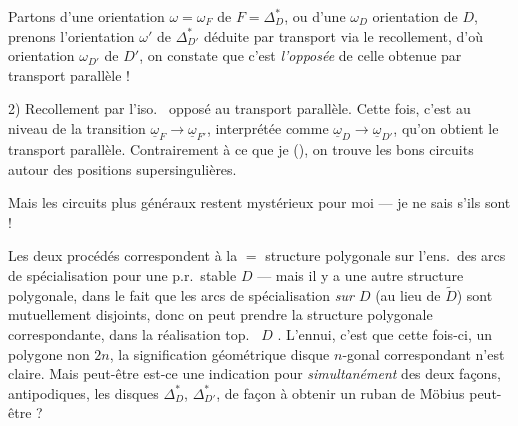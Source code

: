\documentclass[11pt,a4paper]{article}
\begin{document}

Partons d'une orientation $\omega = \omega_F$ de $F = \Delta^{\ast}_D$, ou d'une $\omega_D$ orientation de $D$, prenons l'orientation $\omega'$ de $\Delta^{\ast}_{D'}$ déduite par transport via le recollement, d'où orientation $\omega_{D'}$ de $D'$, on constate  que c'est \emph{l'opposée} de celle obtenue par transport parallèle !

2) Recollement par l'iso.\  opposé au transport parallèle. Cette fois, c'est au niveau de la transition $\underline{\omega}_F \to \underline{\omega}_{F'}$, interprétée comme $\underline{\omega}_D \to \underline{\omega}_{D'}$, qu'on obtient le transport parallèle. Contrairement à ce que je  (), on trouve les bons circuits autour des positions supersingulières.

Mais les circuits plus généraux restent mystérieux pour moi --- je ne sais s'ils sont  !

Les deux procédés correspondent à la $=$ structure polygonale sur l'ens.\ des arcs de spécialisation  pour une p.r.\ stable $D$ --- mais il y a une autre structure polygonale, dans le fait que  les arcs de spécialisation \emph{sur $D$} (au lieu de $\widetilde{D}$) sont mutuellement disjoints, donc on peut prendre la structure polygonale correspondante, dans la réalisation top.\ \ill{} \ill{} $D$ . L'ennui, c'est que cette fois-ci,  un polygone \struck{\ill{}}  non $2n$,  la signification géométrique  disque $n$-gonal correspondant n'est  claire. Mais peut-être est-ce une indication pour  \emph{simultanément} des deux façons, antipodiques, les disques $\Delta^{\ast}_D$, $\Delta^{\ast}_{D'}$, de façon à obtenir un ruban de Möbius peut-être ?
\end{document}
